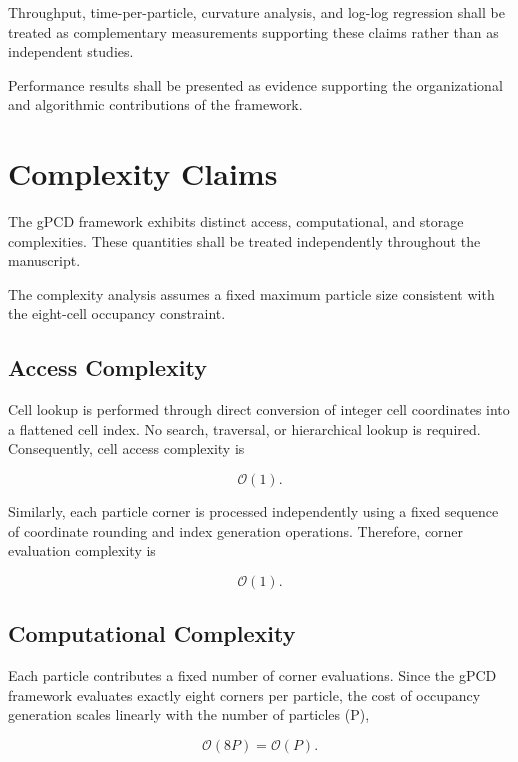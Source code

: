 Throughput, time-per-particle, curvature analysis, and log-log
regression shall be treated as complementary measurements supporting
these claims rather than as independent studies.

Performance results shall be presented as evidence supporting the
organizational and algorithmic contributions of the framework.


\section{Complexity Claims}

The gPCD framework exhibits distinct access, computational, and storage
complexities. These quantities shall be treated independently throughout
the manuscript.

The complexity analysis assumes a fixed maximum particle size
consistent with the eight-cell occupancy constraint.

\subsection{Access Complexity}

Cell lookup is performed through direct conversion of integer cell
coordinates into a flattened cell index. No search, traversal, or
hierarchical lookup is required. Consequently, cell access complexity is

\begin{equation}
\mathcal{O}(1).
\end{equation}

Similarly, each particle corner is processed independently using a fixed
sequence of coordinate rounding and index generation operations.
Therefore, corner evaluation complexity is

\begin{equation}
\mathcal{O}(1).
\end{equation}

\subsection{Computational Complexity}

Each particle contributes a fixed number of corner evaluations. Since
the gPCD framework evaluates exactly eight corners per particle, the
cost of occupancy generation scales linearly with the number of
particles (P),

\begin{equation}
\mathcal{O}(8P)=\mathcal{O}(P).
\end{equation}

